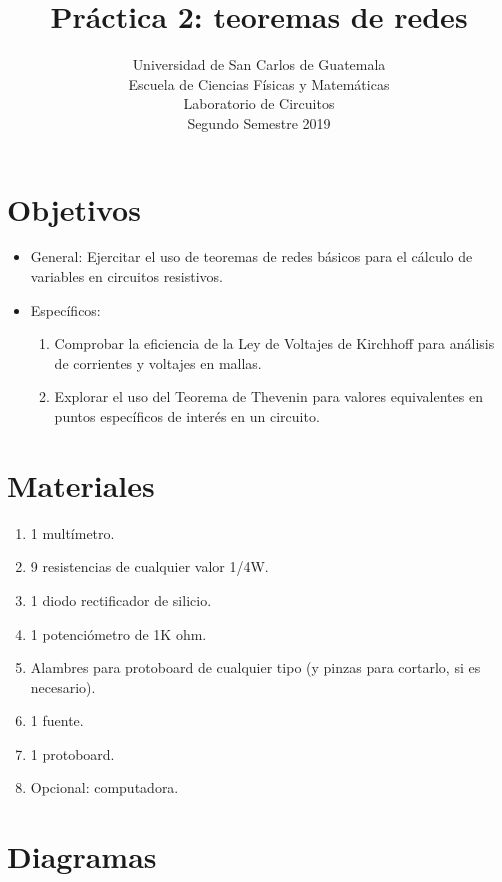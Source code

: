 \documentclass[letterpaper, 12 pt, conference]{ieeeconf}  %
\title{\LARGE \bf
Práctica 2: teoremas de redes
}
\author{Universidad de San Carlos de Guatemala \\%
Escuela de Ciencias Físicas y Matemáticas\\
Laboratorio de Circuitos\\
Segundo Semestre 2019
}
\begin{document}
\maketitle
\thispagestyle{empty}
\pagestyle{empty}

\section{Objetivos}
\begin{itemize}
    \item General: Ejercitar el uso de teoremas de redes básicos para el cálculo de variables en circuitos resistivos.
    \item Específicos:
    \begin{enumerate}
    \item Comprobar la eficiencia de la Ley de Voltajes de Kirchhoff para análisis de corrientes y voltajes en mallas.
    \item Explorar el uso del Teorema de Thevenin para valores equivalentes en puntos específicos de interés en un circuito.
\end{enumerate}
\end{itemize}


\section{Materiales}
\begin{enumerate}
    \item 1 multímetro.
    \item 9 resistencias de cualquier valor 1/4W.
    \item 1 diodo rectificador de silicio.
    \item 1 potenciómetro de 1K ohm.
    \item Alambres para protoboard de cualquier tipo (y pinzas para cortarlo, si es necesario).
    \item 1 fuente.
    \item 1 protoboard.
    \item Opcional: computadora.
\end{enumerate}
\pagebreak

\section{Diagramas}
\end{document}
